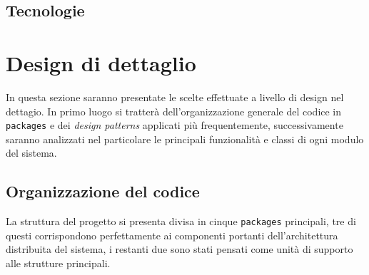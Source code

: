         \subsection{Tecnologie}\label{subsec:technologies}

        \clearpage

    \section{Design di dettaglio}\label{sec:details}

	In questa sezione saranno presentate le scelte effettuate a livello di design nel dettagio. In primo luogo si tratterà dell'organizzazione generale del codice in \texttt{packages} e dei \textit{design patterns} applicati più frequentemente, successivamente saranno analizzati nel particolare le principali funzionalità e classi di ogni modulo del sistema.

    \subsection {Organizzazione del codice}\label{subsec:details:codestructure}
    La struttura del progetto si presenta divisa in cinque \texttt{packages} principali, tre di questi corrispondono perfettamente ai componenti portanti dell'architettura distribuita del sistema, i restanti due sono stati pensati come unità di supporto alle strutture principali.

